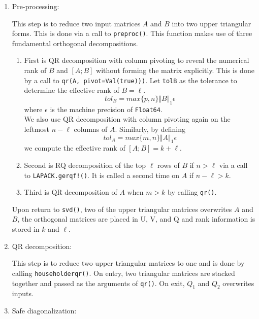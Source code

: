 \begin{enumerate}
    \item Pre-processing:
    
    This step is to reduce two input matrices $A$ and $B$ into two upper triangular forms. This is done via a call to \texttt{preproc()}. This function makes use of three fundamental orthogonal decompositions. 
    \begin{enumerate}
    	\item First is QR decomposition with column pivoting to reveal the numerical rank of $B$ and $[A; B]$ without forming the matrix explicitly. This is done by a call to \texttt{qr(A, pivot=Val(true)))}. Let \texttt{tolB} as the tolerance to determine the effective rank of $B = \ell$.
		\begin{equation*}
			tol_{B} = max\{p, n\}\Vert B \Vert_1 \epsilon
		\end{equation*}
		where $\epsilon$ is the machine precision of \texttt{Float64}. \\
		We also use QR decomposition with column pivoting again on the leftmost $n-\ell$ columns of $A$. Similarly, by defining
		\begin{equation*}
			tol_{A} = max\{m, n\}\Vert A \Vert_1 \epsilon
		\end{equation*}
		we compute the effective rank of $[A; B] = k+ \ell$.
		\item Second is RQ decomposition of the top $\ell$ rows of $B$ if $n > \ell$ via a call to \texttt{LAPACK.gerqf!()}. It is called a second time on $A$ if $n - \ell > k$.
		\item Third is QR decomposition of $A$ when $m > k$ by calling \texttt{qr()}. 
	\end{enumerate}
	Upon return to \texttt{svd()}, two of the upper triangular matrices overwrites $A$ and $B$, the orthogonal matrices are placed in U, V, and Q and rank information is stored in $k$ and $\ell$.
    \item QR decomposition:
    
    This step is to reduce two upper triangular matrices to one and is done by calling \texttt{householderqr()}. On entry, two triangular matrices are stacked together and passed as the arguments of \texttt{qr()}. On exit, $Q_1$ and $Q_2$ overwrites inputs.  
    
    \item Safe diagonalization:
    

\end{enumerate}
